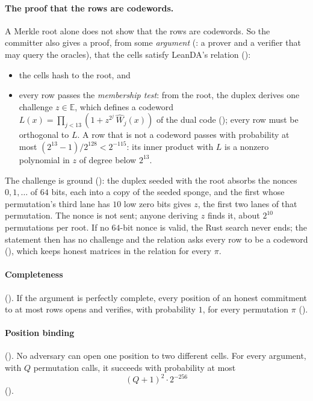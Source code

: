 \documentclass[11pt]{article}
\begin{document}
\paragraph{The proof that the rows are codewords.} A Merkle root alone does not show that the rows
are codewords. So the committer also gives a proof, from some \emph{argument} (: a
prover and a verifier that may query the oracles), that the cells satisfy LeanDA's relation
():
\begin{itemize}
\item the cells hash to the root, and
\item every row passes the \emph{membership test}: from the root, the duplex derives one
challenge $z \in \mathbb{E}$, which defines a codeword $L(x) = \prod_{j<13} (1 + z^{2^j}\,\widehat{W}_j(x))$ of the
dual code (); every row must be orthogonal to $L$. A row that is not a codeword
passes with probability at most $(2^{13}-1)/2^{128} < 2^{-115}$: its inner product with $L$ is a
nonzero polynomial in $z$ of degree below $2^{13}$.
\end{itemize}
The challenge is ground (): the duplex seeded with the root absorbs
the nonces $0, 1, \dots$ of $64$ bits, each into a copy of the seeded sponge, and the first whose
permutation's third lane has $10$ low zero bits gives $z$, the first two lanes of that permutation.
The nonce is not sent; anyone deriving $z$ finds it, about $2^{10}$ permutations per root. If no
$64$-bit nonce is valid, the Rust search never ends; the statement then has no challenge and the
relation asks every row to be a codeword (), which keeps honest matrices
in the relation for every $\pi$.

\paragraph{Completeness} (). If the argument is perfectly
complete, every position of an honest commitment to at most  rows opens and verifies, with probability $1$, for
every permutation $\pi$ ().

\paragraph{Position binding} (). No adversary can open one
position to two different cells. For every argument, with $Q$ permutation calls, it succeeds with
probability at most
\[
\boxed{\ (Q+1)^2\cdot 2^{-256}\ }
\]
().
\end{document}
